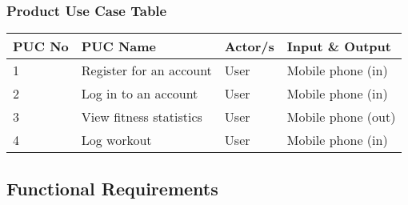 \documentclass{article}
\newcommand\tab{\hspace*{2cm}}
\begin{document}
\subsubsection{Product Use Case Table}
\begingroup
\begin{centering}
\begin{tabular}{|p{2cm} | p{4cm} | p{3cm} | p{3cm} |}
    \hline
    PUC No & PUC Name & Actor/s & Input \& Output \\
    \hline
    1 & Register for an account & User & Mobile phone (in) \\
    \hline
    2 & Log in to an account & User & Mobile phone (in) \\
    \hline
    3 & View fitness statistics & User & Mobile phone (out) \\
    \hline
    4 & Log workout  & User & Mobile phone (in) \\
    \hline
\end{tabular}
\end{centering}
\endgroup



\newpage
\subsection{Functional Requirements}
\end{document}
